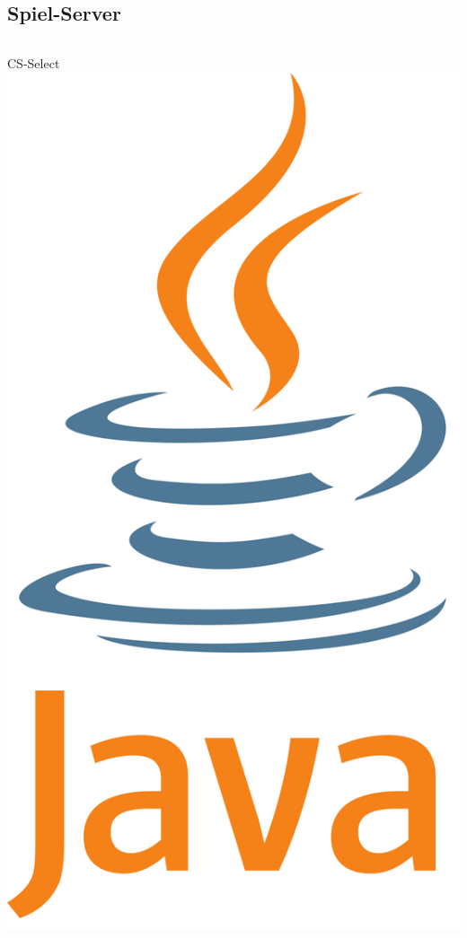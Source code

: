 \documentclass[xcolor=dvipsnames]{beamer}
\begin{document}
\subsection{Spiel-Server}
\begin{frame}
\begin{columns}
\begin{column}{0.5\textwidth}
         \begin{block}{CS-Select}
                \center
                \includegraphics[width=(\textwidth) / 2]{img/java.png}

\end{block}
\end{column}
\end{columns}
\end{frame}
\end{document}
